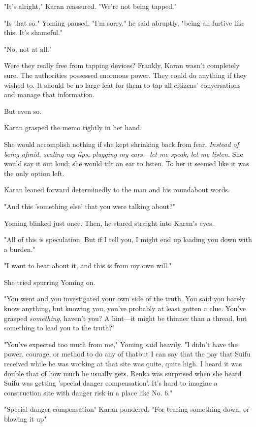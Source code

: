 "It's alright," Karan reassured. "We're not being tapped."

"Is that so." Yoming paused. "I'm sorry," he said abruptly, "being all
furtive like this. It's shameful."

"No, not at all."

Were they really free from tapping devices? Frankly, Karan wasn't
completely sure. The authorities possessed enormous power. They could do
anything if they wished to. It should be no large feat for them to tap
all citizens' conversations and manage that information.

But even so.

Karan grasped the memo tightly in her hand.

She would accomplish nothing if she kept shrinking back from fear.
\emph{Instead of being afraid, sealing my lips, plugging my ears---let me speak,
let me listen.} She would say it out loud; she would tilt an ear to
listen. To her it seemed like it was the only option left.

Karan leaned forward determinedly to the man and his roundabout words.

"And this 'something else' that you were talking about?"

Yoming blinked just once. Then, he stared straight into Karan's eyes.

"All of this is speculation. But if I tell you, I might end up loading
you down with a burden."

"I want to hear about it, and this is from my own will."

She tried spurring Yoming on.

"You went and you investigated your own side of the truth. You said you
barely know anything, but knowing you, you've probably at least gotten a
clue. You've grasped \emph{something}, haven't you? A hint---it might be thinner
than a thread, but something to lead you to the truth?"

"You've expected too much from me," Yoming said heavily. "I didn't have
the power, courage, or method to do any of that\el but I can say that
the pay that Suifu received while he was working at that site was quite,
quite high. I heard it was double that of how much he usually gets.
Renka was surprised when she heard Suifu was getting 'special danger
compensation'. It's hard to imagine a construction site with danger risk
in a place like No. 6."

"Special danger compensation\el " Karan pondered. "For tearing something
down, or blowing it up\el "

